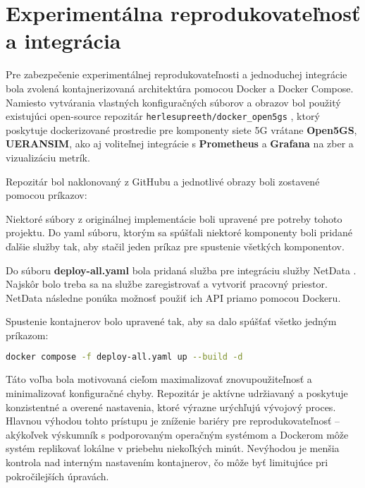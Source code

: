 \section{Experimentálna reprodukovateľnosť a integrácia}

Pre zabezpečenie experimentálnej reprodukovateľnosti a jednoduchej integrácie bola zvolená kontajnerizovaná architektúra pomocou Docker a Docker Compose. Namiesto vytvárania vlastných konfiguračných súborov a obrazov bol použitý existujúci open-source repozitár \texttt{herlesupreeth/docker\_open5gs} \cite{herlesupreeth}, ktorý poskytuje dockerizované prostredie pre komponenty siete 5G vrátane \textbf{Open5GS}, \textbf{UERANSIM}, ako aj voliteľnej integrácie s \textbf{Prometheus} a \textbf{Grafana} na zber a vizualizáciu metrík.

Repozitár bol naklonovaný z GitHubu a jednotlivé obrazy boli zostavené pomocou príkazov:


Niektoré súbory z originálnej implementácie boli upravené pre potreby tohoto projektu. Do yaml súboru, ktorým sa spúšťali niektoré komponenty boli pridané ďalšie služby tak, aby stačil jeden príkaz pre spustenie všetkých komponentov.

Do súboru \textbf{deploy-all.yaml} bola pridaná služba pre integráciu služby NetData \cite{netdata}. Najskôr bolo treba sa na službe zaregistrovať a vytvoriť pracovný priestor. NetData následne ponúka možnosť použiť ich API priamo pomocou Dockeru. 

Spustenie kontajnerov bolo upravené tak, aby sa dalo spúšťať všetko jedným príkazom:

\begin{lstlisting}[language=bash,caption={Build pre jednotlivé docker images}, style=bashstyle]
docker compose -f deploy-all.yaml up --build -d
\end{lstlisting}

Táto voľba bola motivovaná cieľom maximalizovať znovupoužiteľnosť a minimalizovať konfiguračné chyby. Repozitár je aktívne udržiavaný a poskytuje konzistentné a overené nastavenia, ktoré výrazne urýchľujú vývojový proces. Hlavnou výhodou tohto prístupu je zníženie bariéry pre reprodukovateľnosť – akýkoľvek výskumník s podporovaným operačným systémom a Dockerom môže systém replikovať lokálne v priebehu niekoľkých minút. Nevýhodou je menšia kontrola nad interným nastavením kontajnerov, čo môže byť limitujúce pri pokročilejších úpravách.

